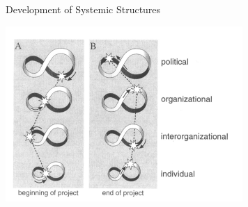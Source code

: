\documentclass{beamer}
\begin{document}
\begin{frame}{Development of Systemic Structures}
  \begin{center}
    \includegraphics[width=.85\textwidth]{Bilder/Holling-5.png}
  \end{center}
\end{frame}
\end{document}
